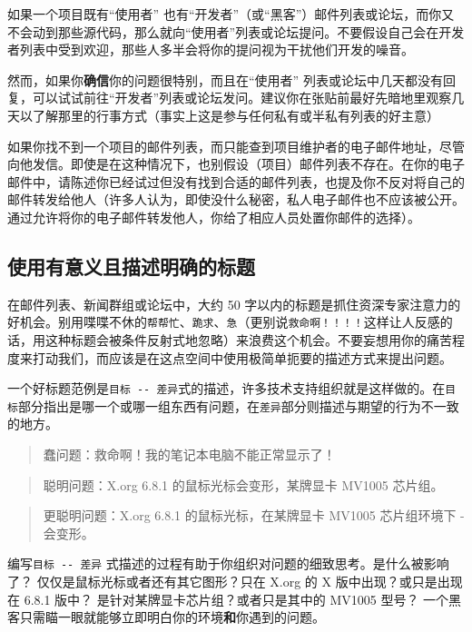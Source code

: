 \documentclass[titlepage]{article}
\begin{document}
如果一个项目既有``使用者''
也有``开发者''（或``黑客''）邮件列表或论坛，而你又不会动到那些源代码，那么就向``使用者''列表或论坛提问。不要假设自己会在开发者列表中受到欢迎，那些人多半会将你的提问视为干扰他们开发的噪音。

然而，如果你\textbf{确信}你的问题很特别，而且在``使用者''
列表或论坛中几天都没有回复，可以试试前往``开发者''列表或论坛发问。建议你在张贴前最好先暗地里观察几天以了解那里的行事方式（事实上这是参与任何私有或半私有列表的好主意）

如果你找不到一个项目的邮件列表，而只能查到项目维护者的电子邮件地址，尽管向他发信。即使是在这种情况下，也别假设（项目）邮件列表不存在。在你的电子邮件中，请陈述你已经试过但没有找到合适的邮件列表，也提及你不反对将自己的邮件转发给他人（许多人认为，即使没什么秘密，私人电子邮件也不应该被公开。通过允许将你的电子邮件转发他人，你给了相应人员处置你邮件的选择）。

\hypertarget{ux4f7fux7528ux6709ux610fux4e49ux4e14ux63cfux8ff0ux660eux786eux7684ux6807ux9898}{\subsection{使用有意义且描述明确的标题}\label{ux4f7fux7528ux6709ux610fux4e49ux4e14ux63cfux8ff0ux660eux786eux7684ux6807ux9898}}

在邮件列表、新闻群组或论坛中，大约 50
字以内的标题是抓住资深专家注意力的好机会。别用喋喋不休的\texttt{帮帮忙}、\texttt{跪求}、\texttt{急}（更别说\texttt{救命啊！！！！}这样让人反感的话，用这种标题会被条件反射式地忽略）来浪费这个机会。不要妄想用你的痛苦程度来打动我们，而应该是在这点空间中使用极简单扼要的描述方式来提出问题。

一个好标题范例是\texttt{目标\ -\/-\ 差异}式的描述，许多技术支持组织就是这样做的。在\texttt{目标}部分指出是哪一个或哪一组东西有问题，在\texttt{差异}部分则描述与期望的行为不一致的地方。

\begin{quote}
蠢问题：救命啊！我的笔记本电脑不能正常显示了！
\end{quote}

\begin{quote}
聪明问题：X.org 6.8.1 的鼠标光标会变形，某牌显卡 MV1005 芯片组。
\end{quote}

\begin{quote}
更聪明问题：X.org 6.8.1 的鼠标光标，在某牌显卡 MV1005 芯片组环境下 -
会变形。
\end{quote}

编写\texttt{目标\ -\/-\ 差异}
式描述的过程有助于你组织对问题的细致思考。是什么被影响了？
仅仅是鼠标光标或者还有其它图形？只在 X.org 的 X 版中出现？或只是出现在
6.8.1 版中？ 是针对某牌显卡芯片组？或者只是其中的 MV1005 型号？
一个黑客只需瞄一眼就能够立即明白你的环境\textbf{和}你遇到的问题。
\end{document}
